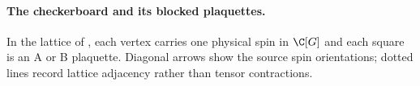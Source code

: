 \paragraph{The checkerboard and its blocked plaquettes.}
In the lattice of \cite[Section~7]{Schuch2010PEPS}, each vertex carries
one physical spin in $\C[G]$ and each square is an A or B plaquette. Diagonal
arrows show the source spin orientations; dotted lines record lattice adjacency rather than tensor contractions.

